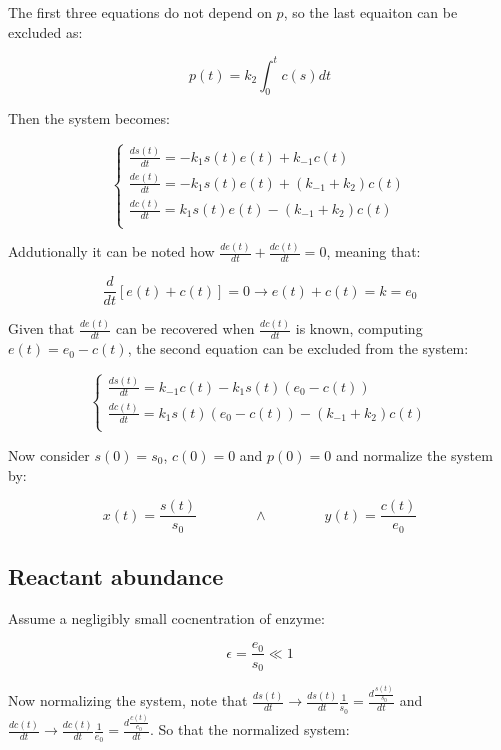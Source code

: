 The first three equations do not depend on $p$, so the last equaiton can be excluded as:

$$p(t) = k_2\int_0^tc(s)dt$$

Then the system becomes:

$$\begin{cases}
  \frac{ds(t)}{dt} = -k_1s(t)e(t) + k_{-1}c(t)\\
  \frac{de(t)}{dt} = -k_1s(t)e(t) + (k_{-1}+k_2)c(t)\\
  \frac{dc(t)}{dt} = k_1s(t)e(t) - (k_{-1}+k_2)c(t)\\
\end{cases}$$

Addutionally it can be noted how $\frac{de(t)}{dt} + \frac{dc(t)}{dt} = 0$, meaning that:

$$\frac{d}{dt}[e(t)+c(t)] = 0\rightarrow e(t) + c(t) = k = e_0$$

Given that $\frac{de(t)}{dt}$ can be recovered when $\frac{dc(t)}{dt}$ is known, computing $e(t) = e_0-c(t)$, the second equation can be excluded from the system:

$$\begin{cases}
  \frac{ds(t)}{dt} = k_{-1}c(t)-k_1s(t)(e_0-c(t)) \\
  \frac{dc(t)}{dt} = k_1s(t)(e_0-c(t)) - (k_{-1}+k_2)c(t)\\
\end{cases}$$

Now consider $s(0) = s_0$, $c(0) = 0$ and $p(0) = 0$ and normalize the system by:

$$x(t) = \frac{s(t)}{s_0}\qquad\qquad\land\qquad\qquad y(t) = \frac{c(t)}{e_0}$$

  \subsection{Reactant abundance}
  Assume a negligibly small cocnentration of enzyme:

  $$\epsilon = \frac{e_0}{s_0}\ll 1$$

  Now normalizing the system, note that $\frac{ds(t)}{dt}\to\frac{ds(t)}{dt}\frac{1}{s_0} = \frac{d\frac{s(t)}{s_0}}{dt}$ and $\frac{dc(t)}{dt}\to\frac{dc(t)}{dt}\frac{1}{e_0}=\frac{d\frac{c(t)}{e_0}}{dt}$.
  So that the normalized system:

